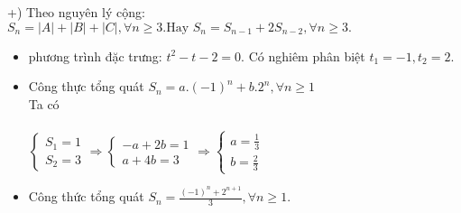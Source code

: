 \documentclass[12pt,oneside]{book}
\begin{document}
+) Theo nguyên lý cộng: $S_n  = |A| +|B| +|C|, \forall n \geq 3.\text{Hay } S_n = S_{n-1} +2S_{n-2}, \forall n \geq 3.$
\begin{itemize}
	\item phương trình đặc trưng: $t^2-t-2=0.$
	Có  nghiêm phân biệt $t_1 = -1, t_2 = 2.$
	\item Công thực tổng quát $S_n = a.(-1)^n+b.2^n, \forall n \geq 1$
	\\Ta có\\\\
	$\begin{cases}
		S_1 = 1\\S_2 =3
	\end{cases}\Rightarrow \begin{cases}
		-a+2b =1\\
		a+4b = 3 
	\end{cases}\Rightarrow \begin{cases}
		a = \frac{1}{3}\\
		b = \frac{2}{3}
	\end{cases} $
	\item Công thức tổng quát $S_n = \frac{(-1)^n+2^{n+1}}{3}, \forall n \geq 1.$
\end{itemize}
\end{document}
